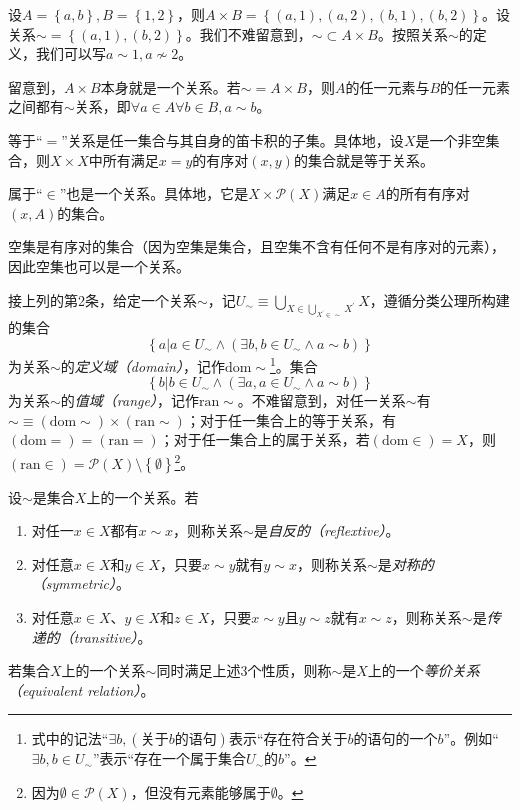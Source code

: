 \documentclass[../main.tex]{subfiles}
\begin{document}
\begin{example}
    设$A=\left\{a,b\right\}, B=\left\{1,2\right\}$，则$A\times B=\left\{\left(a,1\right),\left(a,2\right),\left(b,1\right),\left(b,2\right)\right\}$。设关系$\sim=\left\{\left(a,1\right),\left(b,2\right)\right\}$。我们不难留意到，$\sim\subset A\times B$。按照关系$\sim$的定义，我们可以写$a\sim 1,a\not\sim 2$。

    留意到，$A\times B$本身就是一个关系。若$\sim=A\times B$，则$A$的任一元素与$B$的任一元素之间都有$\sim$关系，即$\forall a\in A\forall b\in B,a\sim b$。

    等于“$=$”关系是任一集合与其自身的笛卡积的子集。具体地，设$X$是一个非空集合，则$X\times X$中所有满足$x=y$的有序对$\left(x,y\right)$的集合就是等于关系。

    属于“$\in$”也是一个关系。具体地，它是$X\times\mathcal{P}\left(X\right)$满足$x\in A$的所有有序对$\left(x,A\right)$的集合。

    空集是有序对的集合（因为空集是集合，且空集不含有任何不是有序对的元素），因此空集也可以是一个关系。
\end{example}

接上列的第2条，给定一个关系$\sim$，记$U_\sim\equiv\bigcup_{X\in\bigcup_{X^\prime\in\sim}X^\prime}X$，遵循分类公理所构建的集合
\[
    \left\{a|a\in U_\sim\wedge\left(\exists b,b\in U_\sim\wedge a\sim b\right)\right\}
\]
为关系$\sim$的\emph{定义域（domain）}，记作$\mathrm{dom}\sim$\footnote{式中的记法“$\exists b,\left(\text{关于$b$的语句}\right)$表示“存在符合关于$b$的语句的一个$b$”。例如“$\exists b,b\in U_\sim$”表示“存在一个属于集合$U_\sim$的$b$”。}。集合
\[
    \left\{b|b\in U_\sim\wedge \left(\exists a,a\in U_\sim\wedge a\sim b\right)\right\}
\]
为关系$\sim$的\emph{值域（range）}，记作$\mathrm{ran}\sim$。不难留意到，对任一关系$\sim$有$\sim\equiv\left(\mathrm{dom}\sim\right)\times\left(\mathrm{ran}\sim\right)$；对于任一集合上的等于关系，有$\left(\mathrm{dom}=\right)=\left(\mathrm{ran}=\right)$；对于任一集合上的属于关系，若$\left(\mathrm{dom}\in\right)=X$，则$\left(\mathrm{ran}\in\right)=\mathcal{P}\left(X\right)\setminus\left\{\emptyset\right\}$\footnote{因为$\emptyset\in\mathcal{P}\left(X\right)$，但没有元素能够属于$\emptyset$。}。

设$\sim$是集合$X$上的一个关系。若
\begin{enumerate}
    \item 对任一$x\in X$都有$x\sim x$，则称关系$\sim$是\emph{自反的（reflextive）}。
    \item 对任意$x\in X$和$y\in X$，只要$x\sim y$就有$y\sim x$，则称关系$\sim$是\emph{对称的（symmetric）}。
    \item 对任意$x\in X$、$y\in X$和$z\in X$，只要$x\sim y\text{且}y\sim z$就有$x\sim z$，则称关系$\sim$是\emph{传递的（transitive）}。
\end{enumerate}
若集合$X$上的一个关系$\sim$同时满足上述3个性质，则称$\sim$是$X$上的一个\emph{等价关系（equivalent relation）}。
\end{document}
